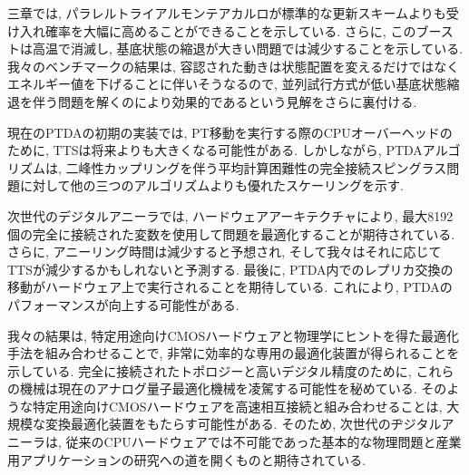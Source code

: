 三章では, パラレルトライアルモンテアカルロが標準的な更新スキームよりも受け入れ確率を大幅に高めることができることを示している. さらに, このブーストは高温で消滅し, 基底状態の縮退が大きい問題では減少することを示している. 我々のベンチマークの結果は, 容認された動きは状態配置を変えるだけではなくエネルギー値を下げることに伴いそうなるので, 並列試行方式が低い基底状態縮退を伴う問題を解くのにより効果的であるという見解をさらに裏付ける. 

現在のPTDAの初期の実装では, PT移動を実行する際のCPUオーバーヘッドのために, TTSは将来よりも大きくなる可能性がある. しかしながら, PTDAアルゴリズムは, 二峰性カップリングを伴う平均計算困難性の完全接続スピングラス問題に対して他の三つのアルゴリズムよりも優れたスケーリングを示す. 

次世代のデジタルアニーラでは, ハードウェアアーキテクチャにより, 最大8192個の完全に接続された変数を使用して問題を最適化することが期待されている. さらに, アニーリング時間は減少すると予想され, そして我々はそれに応じてTTSが減少するかもしれないと予測する. 最後に, PTDA内でのレプリカ交換の移動がハードウェア上で実行されることを期待している. これにより, PTDAのパフォーマンスが向上する可能性がある. 

我々の結果は, 特定用途向けCMOSハードウェアと物理学にヒントを得た最適化手法を組み合わせることで, 非常に効率的な専用の最適化装置が得られることを示している. 
完全に接続されたトポロジーと高いデジタル精度のために, これらの機械は現在のアナログ量子最適化機械を凌駕する可能性を秘めている. 
そのような特定用途向けCMOSハードウェアを高速相互接続と組み合わせることは, 大規模な変換最適化装置をもたらす可能性がある. 
そのため, 次世代のヂジタルアニーラは, 従来のCPUハードウェアでは不可能であった基本的な物理問題と産業用アプリケーションの研究への道を開くものと期待されている. 






